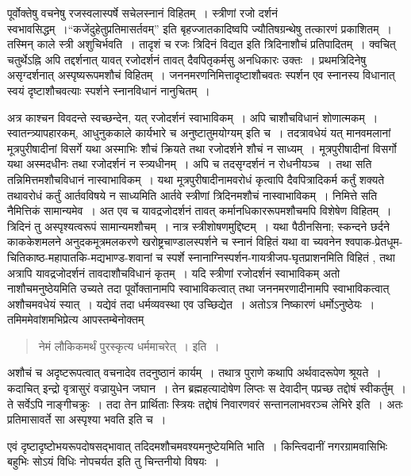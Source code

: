{पूर्वोक्तेषु वचनेषु रजस्वलास्पर्षे सचेलस्नानं विहितम्~। स्त्रीणां रजो दर्शनं स्वभावसिद्धम्~।\break “कजेंदुहेतुप्रतिमासर्तवम्” इति बृहज्जातकादिष्वपि ज्यौतिषग्रन्थेषु तत्कारणं प्रकाशितम्~। तस्मिन् काले स्त्री अशुचिर्भवति~। तादृशं च रजः त्रिदिनं विद्यत इति त्रिदिनाशौचं प्रतिपादितम्~। क्वचित् चतुर्थेऽह्नि अपि तद्दर्शनात् यावत् रजोदर्शनं तावत् दैवपितृकर्मसु अनधिकारः उक्तः~। प्रथमत्रिदिनेषु असृग्दर्शनात् अस्पृष्यरूपमशौचं विहितम्~। जननमरणनिमित्तादृष्टा\-शौचवतः स्पर्शन एव स्नानस्य विधानात् स्वयं दृष्टाशौचवत्याः स्पर्शने स्नानविधानं नानुचितम्~। 

अत्र काश्चन विवदन्ते स्वच्छन्देन, यत् रजोदर्शनं स्वाभाविकम्~। अपि चाशौचविधानं शोणात्मकम्~। स्वातन्त्र्यापहारकम्, आधुनुककाले कार्यभारे च अनुष्टातुमयोग्यम् इति च~। तदत्रावधेयं यत् मानवमलानां मूत्रपुरीषादीनां विसर्गे यथा अस्माभिः शौचं क्रियते तथा रजोदर्शने शौचं न साध्यम्~। मूत्रपुरीषादीनां विसर्गो यथा अस्मदधीनः तथा रजोदर्शनं न स्त्र्यधीनम्~। अपि च तदसृग्दर्शनं न रोधनीयञ्च~। तथा सति तन्निमित्तमशौचविधानं नास्वाभाविकम्~। यथा मूत्रपुरीषादीनामवरोधं कृत्वापि दैवपित्रादिकर्म कर्तुं शक्यते तथावरोधं कर्तुं आर्तवविषये न साध्यमिति आर्तवे स्त्रीणां त्रिदिनमशौचं नास्वाभाविकम्~। निमित्ते सति नैमित्तिकं सामान्यमेव~। अत एव च यावद्रजोदर्शनं तावत् कर्मानधिकाररूपमशौचमपि विशेषेण विहितम्~। त्रिदिनं तु अस्पृश्यत्वरूपं सामान्यमशौचम्~। नात्र स्त्रीशोषणमुद्दिष्टम्~। यथा पैठीनसिना; स्कन्दने छर्दने काककेशमलने अनुदकमूत्रमलकरणे खरोष्ट्रचाण्डालस्पर्शने च स्नानं विहितं यथा वा च्यवनेन श्वपाक-प्रेतधूम-चितिकाष्ठ-महापातकि-मद्यभाण्ड-शवानां च स्पर्शे स्नानाग्निस्पर्शन-गायत्रीजप-घृतप्राशनमिति विहितं , तथा अत्रापि यावद्रजोदर्शनं तावदाशौचविधानं कृतम्~। यदि स्त्रीणां रजोदर्शनं स्वाभाविकम् अतो नाशौचमनुष्ठेयमिति उच्यते तदा पूर्वोक्तानामपि स्वाभाविकत्वात् तथा जननमरणादीनामपि स्वाभाविकत्वात् अशौचमवधेयं स्यात्~। यद्येवं तदा धर्मव्यवस्था एव उच्छिद्येत~। अतोऽत्र निष्कारणं धर्मोऽनुष्ठेयः~। तमिममेवांशमभिप्रेत्य आपस्तम्बेनोक्तम् 

\begin{verse}
नेमं लौकिकमर्थं पुरस्कृत्य धर्ममाचरेत्~। इति~। 
\end{verse}
अशौचं च अदृष्टरूपत्वात् वचनादेव तदनुष्ठानं कार्यम्~। तथात्र पुराणे कथापि अर्थवादरूपेण श्रूयते~। कदाचित् इन्द्रो वृत्रासुरं वज्रायुधेन जघान~। तेन ब्रह्महत्यादोषेण लिप्तः स देवादीन् पप्रच्छ तद्दोषं स्वीकर्तुम्~। ते सर्वेऽपि नाङ्गीचक्रुः~। तदा तेन प्रार्थिताः स्त्रियः तद्दोषं निवारणवरं सन्तानलाभवरञ्च लेभिरे इति~। अतः प्रतिमासावर्ते सा अस्पृश्या भवति इति च~। 

एवं दृष्टादृष्टोभयरूपदोषसद्भावात् तदिदमशौचमवश्यमनुष्टेयमिति भाति~। किन्त्विदानीं नगरग्रामवासिभिः बहुभिः सोऽयं विधिः नोपचर्यत इति तु चिन्तनीयो विषयः~। 

}
